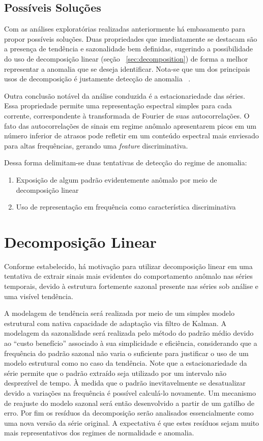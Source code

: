 \subsection{Possíveis Soluções}

Com as análises exploratórias realizadas anteriormente há embasamento para
propor possíveis soluções. Duas propriedades que imediatamente se destacam são
a presença de tendência e sazonalidade bem definidas, sugerindo a possibilidade
do uso de decomposição linear (seção ~\ref{sec:decomposition}) de forma a melhor
representar a anomalia que se deseja identificar. Nota-se que um dos principais
usos de decomposição é justamente detecção de anomalia
~\cite{anomaly_detection}.

Outra conclusão notável da análise conduzida é a estacionariedade das séries.
Essa propriedade permite uma representação espectral simples para cada
corrente, correspondente à transformada de Fourier de suas autocorrelações. O
fato das autocorrelações de sinais em regime anômalo apresentarem picos em um
número inferior de atrasos pode refletir em um conteúdo espectral mais
enviesado para altas frequências, gerando uma \emph{feature} discriminativa.

Dessa forma delimitam-se duas tentativas de detecção do regime de anomalia:

\begin{enumerate}
    \item Exposição de algum padrão evidentemente anômalo por meio de decomposição linear
    \item Uso de representação em frequência como característica discriminativa
\end{enumerate}

\section{Decomposição Linear}

Conforme estabelecido, há motivação para utilizar decomposição linear em uma
tentativa de extrair sinais mais evidentes do comportamento anômalo nas séries
temporais, devido à estrutura fortemente sazonal presente nas séries sob
análise e uma visível tendência.

A modelagem de tendência será realizada por meio de um simples modelo
estrutural com nativa capacidade de adaptação via filtro de Kalman. A modelagem
da sazonalidade será realizada pelo método do padrão médio devido ao ``custo
benefício'' associado à sua simplicidade e eficiência, considerando que a
frequência do padrão sazonal não varia o suficiente para justificar o uso de
um modelo estrutural como no caso da tendência. Note
que a estacionariedade da série permite que o padrão extraído seja utilizado
por um intervalo não desprezível de tempo. À medida que o padrão
inevitavelmente se desatualizar devido a variações na frequência é possível
calculá-lo novamente. Um mecanismo de reajuste do modelo sazonal será então
desenvolvido a partir de um gatilho de erro. Por fim os resíduos da
decomposição serão analisados essencialmente como uma nova versão da série
original. A expectativa é que estes resíduos sejam muito mais representativos
dos regimes de normalidade e anomalia.

